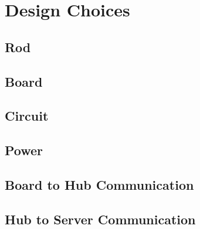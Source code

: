 \chapter{Design Choices}

\section{Rod}
    
\section{Board}
\section{Circuit}

\section{Power}
    

\section{Board to Hub Communication}
\section{Hub to Server Communication}
    
    
    
    
    